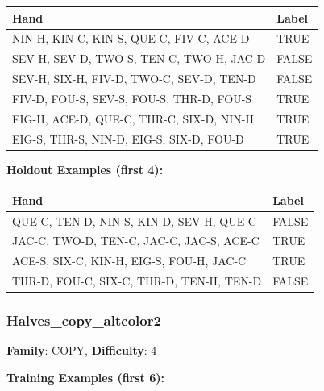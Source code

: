 \documentclass[10pt,a4paper]{article}
\begin{document}
\begin{small}
\begin{tabular}{p{8cm}l}
\toprule
Hand & Label \\
\midrule
NIN-H, KIN-C, KIN-S, QUE-C, FIV-C, ACE-D & \textcolor{positive}{TRUE} \\
SEV-H, SEV-D, TWO-S, TEN-C, TWO-H, JAC-D & \textcolor{negative}{FALSE} \\
SEV-H, SIX-H, FIV-D, TWO-C, SEV-D, TEN-D & \textcolor{negative}{FALSE} \\
FIV-D, FOU-S, SEV-S, FOU-S, THR-D, FOU-S & \textcolor{positive}{TRUE} \\
EIG-H, ACE-D, QUE-C, THR-C, SIX-D, NIN-H & \textcolor{positive}{TRUE} \\
EIG-S, THR-S, NIN-D, EIG-S, SIX-D, FOU-D & \textcolor{positive}{TRUE} \\
\bottomrule
\end{tabular}
\end{small}

\textbf{Holdout Examples (first 4):}

\begin{small}
\begin{tabular}{p{8cm}l}
\toprule
Hand & Label \\
\midrule
QUE-C, TEN-D, NIN-S, KIN-D, SEV-H, QUE-C & \textcolor{negative}{FALSE} \\
JAC-C, TWO-D, TEN-C, JAC-C, JAC-S, ACE-C & \textcolor{positive}{TRUE} \\
ACE-S, SIX-C, KIN-H, EIG-S, FOU-H, JAC-C & \textcolor{positive}{TRUE} \\
THR-D, FOU-C, SIX-C, THR-D, TEN-H, TEN-D & \textcolor{negative}{FALSE} \\
\bottomrule
\end{tabular}
\end{small}

\vspace{0.5cm}

\subsubsection{Halves\_copy\_altcolor2}

\textbf{Family}: COPY, \textbf{Difficulty}: 4

\textbf{Training Examples (first 6):}
\end{document}
